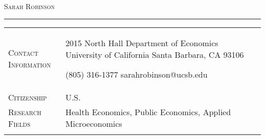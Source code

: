 \documentclass[11pt]{article}
\begin{document}
\thispagestyle{firstpage}

\begin{center}
	
{\huge\textsc{Sarah Robinson}} \\[2pt]

\end{center}

\vspace{-6pt}

\noindent\rule{\textwidth}{1pt}

\vspace{3pt}

\begin{tabularx}{\textwidth}{@{}Y Z@{}}
	
	\textsc{Contact \newline Information} & 
	\begin{minipage}[t]{0.35\textwidth}
		2015 North Hall \newline
		Department of Economics \newline
		University of California \newline
		Santa Barbara, CA 93106
	\end{minipage}\begin{minipage}[t]{0.4\textwidth}
	 (805) 316-1377 \newline
	 sarahrobinson@ucsb.edu \newline
	 \href{https://www.s-robinson.com}{\color{blue}{www.s-robinson.com}}
	\end{minipage}
	\newline  \\ \addlinespace[15pt] 
	
	\textsc{Citizenship} & 
	U.S.
	\\ \addlinespace[20pt] 
	
	\textsc{Research Fields} & 
	Health Economics, Public Economics, Applied Microeconomics
	 \\ \addlinespace[20pt] 
	

\end{tabularx}
\end{document}
